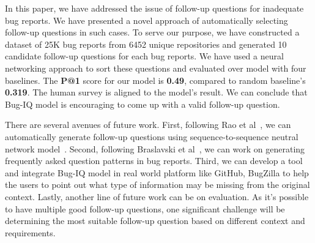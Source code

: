 In this paper, we have addressed the issue of follow-up questions for inadequate bug reports. We have presented a novel approach of automatically selecting follow-up questions in such cases. To serve our purpose, we have constructed a dataset of 25K bug reports from 6452 unique repositories and generated 10 candidate follow-up questions for each bug reports. We have used a neural networking approach to sort these questions and evaluated over model with four baselines. The \textbf{P@1} score for our model is \textbf{0.49}, compared to random baseline's \textbf{0.319}. The human survey is aligned to the model's result. We can conclude that Bug-IQ model is encouraging to come up with a valid follow-up question.

There are several avenues of future work. First, following Rao et al~\cite{rao2019answer}, we can automatically generate follow-up questions using sequence-to-sequence neutral network model~\cite{sutskever2014sequence, yin2015neural, serban2015building}. Second, following Braslavski et al~\cite{10.1145/3020165.3022149}, we can work on generating frequently asked question patterns in bug reports. Third, we can develop a tool and integrate Bug-IQ model in real world platform like GitHub, BugZilla to help the users to point out what type of information may be missing from the original context. Lastly, another line of future work can be on evaluation. As it's possible to have multiple good follow-up questions, one significant challenge will be determining the most suitable follow-up question based on different context and requirements.